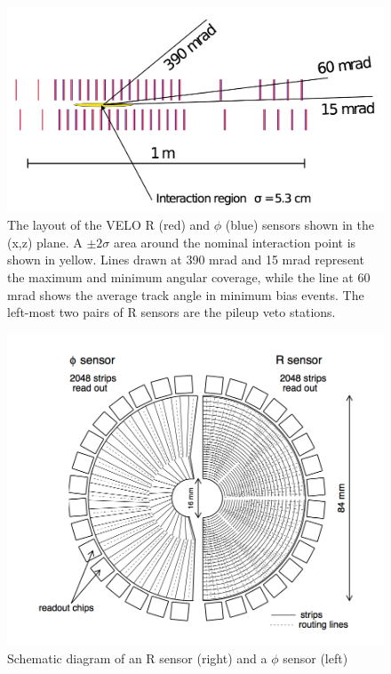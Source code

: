 \begin{figure}
	\centering
	\includegraphics[width=0.7\columnwidth]{Chapters/detector/images/velo_angular_acceptance.png}
	\caption{The layout of the VELO R (red) and $\phi$ (blue) sensors shown in the (x,z) plane. A $\pm2\sigma$ area around the nominal interaction point is shown in yellow. Lines drawn at 390 mrad and 15 mrad represent the maximum and minimum angular coverage, while the line at 60 mrad shows the average track angle in minimum bias events. The left-most two pairs of R sensors are the pileup veto stations.}
	\label{fig: velo angular acceptance}
\end{figure}


\begin{figure}
	\centering
	\includegraphics[width=0.5\columnwidth]{Chapters/detector/images/r-phi_sensors.png}
	\caption{Schematic diagram of an R sensor (right) and a $\phi$ sensor (left)}
	\label{fig: r-phi sensors}
\end{figure}